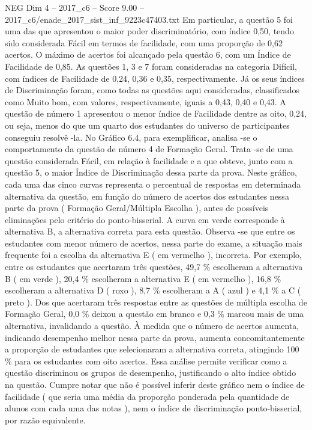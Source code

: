 \begin{textsample}{NEG Dim 4 – 2017\_c6 – Score 9.00 – 2017\_c6/enade\_2017\_sist\_inf\_9223c47403.txt}
Em particular, a questão 5 foi uma das que apresentou o maior poder discriminatório, com índice 0,50, tendo sido considerada Fácil em termos de facilidade, com uma proporção de 0,62 acertos.
O máximo de acertos foi alcançado pela questão 6, com um Índice de Facilidade de 0,85.
As questões 1, 3 e 7 foram consideradas na categoria Difícil, com índices de Facilidade de 0,24, 0,36 e 0,35, respectivamente.
Já os seus índices de Discriminação foram, como todas as questões aqui consideradas, classificados como Muito bom, com valores, respectivamente, iguais a 0,43, 0,40 e 0,43.
A questão de número 1 apresentou o menor índice de Facilidade dentre as oito, 0,24, ou seja, menos do que um quarto dos estudantes do universo de participantes conseguiu resolvê -la.
No Gráfico 6.4, para exemplificar, analisa -se o comportamento da questão de número 4 de Formação Geral.
Trata -se de uma questão considerada Fácil, em relação à facilidade e a que obteve, junto com a questão 5, o maior Índice de Discriminação dessa parte da prova.
Neste gráfico, cada uma das cinco curvas representa o percentual de respostas em determinada alternativa da questão, em função do número de acertos dos estudantes nessa parte da prova ( Formação Geral/Múltipla Escolha ), antes de possíveis eliminações pelo critério do ponto-bisserial.
A curva em verde corresponde à alternativa B, a alternativa correta para esta questão.
Observa -se que entre os estudantes com menor número de acertos, nessa parte do exame, a situação mais frequente foi a escolha da alternativa E ( em vermelho ), incorreta.
Por exemplo, entre os estudantes que acertaram três questões, 49,7 \% escolheram a alternativa B ( em verde ), 20,4 \% escolheram a alternativa E ( em vermelho ), 16,8 \% escolheram a alternativa D ( roxo ), 8,7 \% escolheram a A ( azul ) e 4,1 \% a C ( preto ).
Dos que acertaram três respostas entre as questões de múltipla escolha de Formação Geral, 0,0 \% deixou a questão em branco e 0,3 \% marcou mais de uma alternativa, invalidando a questão.
À medida que o número de acertos aumenta, indicando desempenho melhor nessa parte da prova, aumenta concomitantemente a proporção de estudantes que selecionaram a alternativa correta, atingindo 100 \% para os estudantes com oito acertos.
Essa análise permite verificar como a questão discriminou os grupos de desempenho, justificando o alto índice obtido na questão.
Cumpre notar que não é possível inferir deste gráfico nem o índice de facilidade ( que seria uma média da proporção ponderada pela quantidade de alunos com cada uma das notas ), nem o índice de discriminação ponto-bisserial, por razão equivalente.

\end{textsample}
